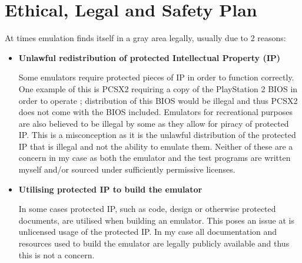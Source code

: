\section{Ethical, Legal and Safety Plan}

At times emulation finds itself in a gray area legally, usually due to 2 reasons:

\begin{itemize}
    \item \textbf{Unlawful redistribution of protected Intellectual Property (IP)} %
    
    Some emulators require protected pieces of IP in order to function correctly. One example of this is PCSX2 requiring a copy of the PlayStation 2 BIOS in order to operate \cite{PCSX2-getting-started}; distribution of this BIOS would be illegal and thus PCSX2 does not come with the BIOS included. Emulators for recreational purposes are also believed to be illegal by some as they allow for piracy of protected IP. This is a misconception as it is the unlawful distribution of the protected IP that is illegal and not the ability to emulate them. Neither of these are a concern in my case as both the emulator and the test programs are written myself and/or sourced under sufficiently permissive licenses.

    \item \textbf{Utilising protected IP to build the emulator} %
    
    In some cases protected IP, such as code, design or otherwise protected documents, are utilised when building an emulator. This poses an issue at is unlicensed usage of the protected IP. In my case all documentation and resources used to build the emulator are legally publicly available and thus this is not a concern.
\end{itemize}